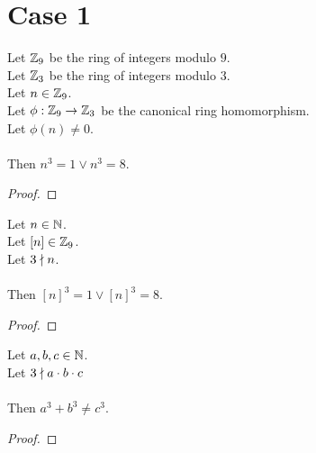 
\chapter*{Case 1}

\begin{lemma}
  \label{lmm:cube_of_castHom_ne_zero}
  \leanok
  Let $\mathbb{Z}_9$ be the ring of integers modulo $9$. \\
  Let $\mathbb{Z}_3$ be the ring of integers modulo $3$. \\
  Let $n \in \mathbb{Z}_9$. \\
  Let $\phi : \mathbb{Z}_9 \to \mathbb{Z}_3$ be the canonical ring homomorphism. \\
  Let $\phi(n) \neq 0$. \\ \\
  Then $n^3=1 \lor n^3=8$.
\end{lemma}
\begin{proof}
  \leanok
\end{proof}

\begin{lemma}
  \label{lmm:cube_of_not_dvd}
  \leanok
  Let $n \in \mathbb{N}$. \\
  Let $\left[n \right] \in \mathbb{Z}_9$. \\
  Let $3 \nmid n$. \\ \\
  Then $\left[n \right]^3 = 1 \lor \left[n \right]^3 = 8$.
\end{lemma}
\begin{proof}
  \leanok
\end{proof}

\begin{theorem}
    \label{thm:fermatLastTheoremThree_case_1}
    \leanok
    Let $a, b, c \in \mathbb{N}$. \\
    Let $3 \nmid a \cdot b \cdot c$ \\\\
    Then $a ^ 3 + b ^ 3 \neq c ^ 3$.
\end{theorem}
\begin{proof}
  \leanok
\end{proof}
